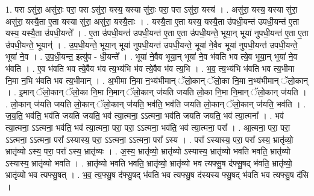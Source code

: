 \documentclass[17pt]{extarticle}
\begin{document}
1. परा ऽसु॑रा॒ असु॑राः॒ परा॒ परा ऽसु॑रा॒ यस्य॒ यस्या सु॑राः॒ परा॒ परा ऽसु॑रा॒ यस्य॑ । . असु॑रा॒ यस्य॒ यस्या सु॑रा॒ असु॑रा॒ यस्यै॒ता ए॒ता यस्या सु॑रा॒ असु॑रा॒ यस्यै॒ताः । . यस्यै॒ता ए॒ता यस्य॒ यस्यै॒ता उ॑पधी॒यन्त॑ उपधी॒यन्त॑ ए॒ता यस्य॒ यस्यै॒ता उ॑पधी॒यन्ते᳚ । . ए॒ता उ॑पधी॒यन्त॑ उपधी॒यन्त॑ ए॒ता ए॒ता उ॑पधी॒यन्ते॒ भूया॒न् भूया॑ नुपधी॒यन्त॑ ए॒ता ए॒ता उ॑पधी॒यन्ते॒ भूयान्॑ । . उ॒प॒धी॒यन्ते॒ भूया॒न् भूया॑ नुपधी॒यन्त॑ उपधी॒यन्ते॒ भूया॑ ने॒वैव भूया॑ नुपधी॒यन्त॑ उपधी॒यन्ते॒ भूया॑ ने॒व । . उ॒प॒धी॒यन्त॒ इत्यु॑प - धी॒यन्ते᳚ । . भूया॑ ने॒वैव भूया॒न् भूया॑ ने॒व भ॑वति भव त्ये॒व भूया॒न् भूया॑ ने॒व भ॑वति । . ए॒व भ॑वति भव त्ये॒वैव भ॑व त्य॒भ्य॑भि भ॑व त्ये॒वैव भ॑व त्य॒भि । . भ॒व॒ त्य॒भ्य॑भि भ॑वति भव त्य॒भीमा नि॒मा न॒भि भ॑वति भव त्य॒भीमान् । . अ॒भीमा नि॒मा न॒भ्य॑भीमान् ॅलो॒कान् ॅलो॒का नि॒मा न॒भ्य॑भीमान् ॅलो॒कान् । . इ॒मान् ॅलो॒कान् ॅलो॒का नि॒मा नि॒मान् ॅलो॒कान् ज॑यति जयति लो॒का नि॒मा नि॒मान् ॅलो॒कान् ज॑यति । . लो॒कान् ज॑यति जयति लो॒कान् ॅलो॒कान् ज॑यति॒ भव॑ति॒ भव॑ति जयति लो॒कान् ॅलो॒कान् ज॑यति॒ भव॑ति । . ज॒य॒ति॒ भव॑ति॒ भव॑ति जयति जयति॒ भव॑ त्या॒त्मना॒ ऽऽत्मना॒ भव॑ति जयति जयति॒ भव॑ त्या॒त्मना᳚ । . भव॑ त्या॒त्मना॒ ऽऽत्मना॒ भव॑ति॒ भव॑ त्या॒त्मना॒ परा॒ परा॒ ऽऽत्मना॒ भव॑ति॒ भव॑ त्या॒त्मना॒ परा᳚ । . आ॒त्मना॒ परा॒ परा॒ ऽऽत्मना॒ ऽऽत्मना॒ परा᳚ ऽस्यास्य॒ परा॒ ऽऽत्मना॒ ऽऽत्मना॒ परा᳚ ऽस्य । . परा᳚ ऽस्यास्य॒ परा॒ परा᳚ ऽस्य॒ भ्रातृ॑व्यो॒ भ्रातृ॑व्यो ऽस्य॒ परा॒ परा᳚ ऽस्य॒ भ्रातृ॑व्यः । . अ॒स्य॒ भ्रातृ॑व्यो॒ भ्रातृ॑व्यो ऽस्यास्य॒ भ्रातृ॑व्यो भवति भवति॒ भ्रातृ॑व्यो ऽस्यास्य॒ भ्रातृ॑व्यो भवति । . भ्रातृ॑व्यो भवति भवति॒ भ्रातृ॑व्यो॒ भ्रातृ॑व्यो भव त्यफ्सु॒ष द॑फ्सु॒षद् भ॑वति॒ भ्रातृ॑व्यो॒ भ्रातृ॑व्यो भव त्यफ्सु॒षत् । . भ॒व॒ त्य॒फ्सु॒ष द॑फ्सु॒षद् भ॑वति भव त्यफ्सु॒ष द॑स्यस्य फ्सु॒षद् भ॑वति भव त्यफ्सु॒ष द॑सि । \newline
\end{document}
